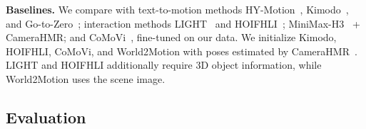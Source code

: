\noindent\textbf{Baselines.} We compare with text-to-motion methods HY-Motion~\citep{hymotion2025}, Kimodo~\citep{Kimodo2026}, and Go-to-Zero~\citep{fan2025gotozero}; interaction methods LIGHT~\citep{wang2026light} and HOIFHLI~\citep{wu2025hoifhli}; MiniMax-H3~\citep{minimaxh3} + CameraHMR; and CoMoVi~\citep{zhao2026comovi}, fine-tuned on our data. We initialize Kimodo, HOIFHLI, CoMoVi, and World2Motion with poses estimated by CameraHMR~\citep{patel2025camerahmr}. LIGHT and HOIFHLI additionally require 3D object information, while World2Motion uses the scene image.

\subsection{Evaluation}
\label{sec:evaluation}


